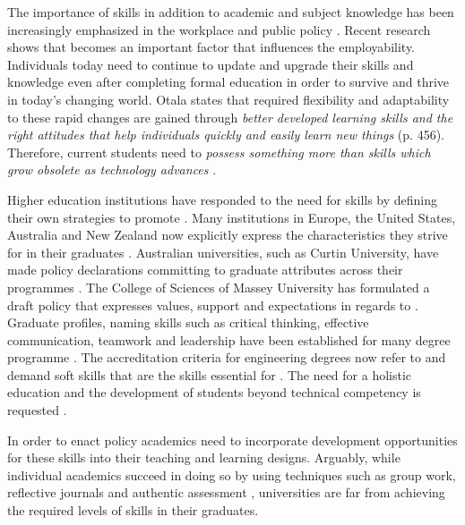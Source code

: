 
The importance of \LLLs skills in addition to academic and subject knowledge has
been increasingly emphasized in the workplace and public policy
\citep{Morgan-Klein2007,Sutherland2006}. Recent research
\citep{Simmons-McDonald2009} shows that \LLLs becomes an important factor that
influences the employability. Individuals today need to continue to update and
upgrade their skills and knowledge even after completing formal education in
order to survive and thrive in today's changing world. Otala
\citeyearpar{Otala1997} states that required flexibility and adaptability to
these rapid changes are gained through \textit{better developed learning skills
and the right attitudes that help individuals quickly and easily learn new
things} (p. 456). Therefore, current students need to \textit{possess something
more than skills which grow obsolete as technology advances}
\cite[p.~195]{Field2003}.

Higher education institutions have responded to the need for \LLLs skills by
defining their own strategies to promote \LLLsn. Many institutions in Europe,
the United States, Australia and New Zealand now explicitly express the \LLLs
characteristics they strive for in their graduates \citep{Scanlon2006}.
Australian universities, such as Curtin University, have made policy
declarations committing to graduate attributes across their programmes
\citep{CurtinUniversity2006}. The College of Sciences of Massey University has
formulated a draft \LLLs policy \citep{MasseyUniversity2008} that expresses
values, support and expectations in regards to \LLLsn. Graduate profiles, naming
\LLLs skills such as critical thinking, effective communication, teamwork and
leadership have been established for many degree programme
\citep{Davies2003,McAlister2003}. The accreditation criteria for engineering
degrees now refer to and demand soft skills that are the skills essential for
\LLLs \citep{Aller2005,Muffo2001}.
The need for a holistic education and the development of students beyond technical
competency is requested
\citep{Brakke2002,Davies2003,Dowling2006,Fallows2003,Grabowski2004,Hernon2006}.

In order to enact policy academics need to incorporate development opportunities
for these skills into their teaching and learning designs. Arguably, while
individual academics succeed in doing so by using techniques such as group work,
reflective journals and authentic assessment \citep{Clarke2003,Lombardi2008},
universities are far from achieving the required levels of \LLLs skills in their
graduates.

